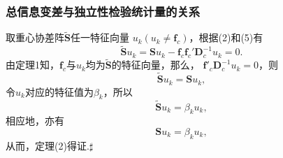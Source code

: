 \begin{frame}\frametitle{\color{blue}总信息变差与独立性检验统计量的关系}

\begin{footnotesize}
 {}\quad\quad 取重心协差阵$\mathbf{\widetilde{S}}$任一特征向量
                   $u_{k}(u_{k}\neq\mathbf{f}_{c})$，根据(2)和(5)有
                    $$\mathbf{\widetilde{S}}u_{k}=\mathbf{S}u_{k}-\mathbf{f}_{c}\mathbf{f}_{c}'\mathbf{D}_{c}^{-1}u_{k}=0.$$
                    由定理1知，$\mathbf{f}_{c}$与$u_{k}$均为$\mathbf{\widetilde{S}}$的特征向量，那么，
                   $\mathbf{f}'_{c}\mathbf{D}_{c}^{-1}u_{k}=0$，则
                   $$\mathbf{\widetilde{S}}u_{k}=\mathbf{S}u_{k},$$
                   令$u_{k}$对应的特征值为$\beta_{k}$，所以
                    $$\mathbf{\widetilde{S}}u_{k}=\beta_{k}u_{k},$$相应地，亦有
                    $$\mathbf{S}u_{k}=\beta_{k}u_{k},$$
                    从而，定理(2)得证.\quad $\sharp$

 \end{footnotesize}
\end{frame}

